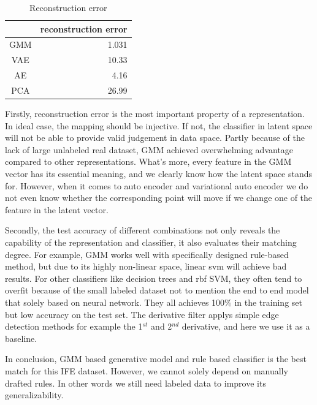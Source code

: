 \documentclass[10pt,twocolumn,letterpaper]{article}
\begin{document}
\begin{table}
    \centering
    \caption{Reconstruction error}
      \begin{tabular}{cr}
        \hline
            & \multicolumn{1}{p{12.535em}}{reconstruction error} \\
            \hline
      GMM   & 1.031 \\
      VAE   & 10.33 \\
      AE    & 4.16 \\
      PCA   & 26.99 \\
      \hline
      \end{tabular}%
    \label{tab:addlabel}%
  \end{table}%
  

Firstly, reconstruction error is the most important property of a representation. In ideal case, the mapping should be injective. If not, the classifier in latent space will not be able to provide valid judgement in data space. Partly because of the lack of large unlabeled real dataset, GMM achieved overwhelming advantage compared to other representations. What's more, every feature in the GMM vector has its essential meaning, and we clearly know how the latent space stands for. However, when it comes to auto encoder and variational auto encoder we do not even know whether the corresponding point will move if we change one of the feature in the latent vector.

Secondly, the test accuracy of different combinations not only reveals the capability of the representation and classifier, it also evaluates their matching degree. For example, GMM works well with specifically designed rule-based method, but due to its highly non-linear space, linear svm will achieve bad results. For other classifiers like decision trees and rbf SVM, they often tend to overfit because of the small labeled dataset not to mention the end to end model that solely based on neural network. They all achieves 100$\%$ in the training set but low accuracy on the test set. The derivative filter applys simple edge detection methods for example the 1$^{st}$ and 2$^{nd}$ derivative, and here we use it as a baseline.

In conclusion, GMM based generative model and rule based classifier is the best match for this IFE dataset. However, we cannot solely depend on manually drafted rules. In other words we still need labeled data to improve its generalizability.
\end{document}
